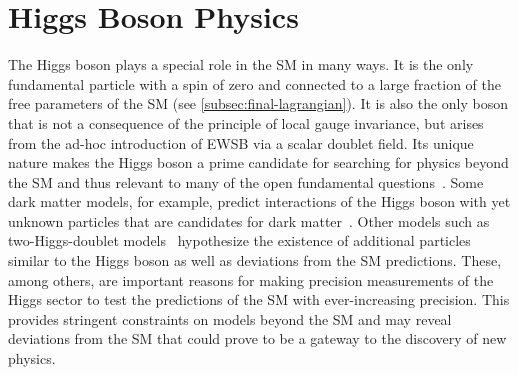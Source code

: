 \chapter{Higgs Boson Physics}
\label{chap:higgs}


The Higgs boson plays a special role in the SM in many ways.
It is the only fundamental particle with a spin of zero and connected to a large fraction of the free parameters of the SM (see \cref{subsec:final-lagrangian}). It is also the only boson that is not a consequence of the principle of local gauge invariance, but arises from the ad-hoc introduction of EWSB via a scalar doublet field. 
Its unique nature makes the Higgs boson a prime candidate for searching for physics beyond the SM and thus relevant to many of the open fundamental questions~\cite{2019BHeinemann}. 
Some dark matter models, for example, predict interactions of the Higgs boson with yet unknown particles that are candidates for dark matter~\cite{Baumgart_2009,Kaplan_2009,Dienes_2012}. 
Other models such as two-Higgs-doublet models~\cite{Branco_2012} hypothesize the existence of additional particles similar to the Higgs boson as well as deviations from the SM predictions. 
These, among others, are important reasons for making precision measurements of the Higgs sector to test the predictions of the SM with ever-increasing precision.
This provides stringent constraints on models beyond the SM and may reveal deviations from the SM that could prove to be a gateway to the discovery of new physics. 

